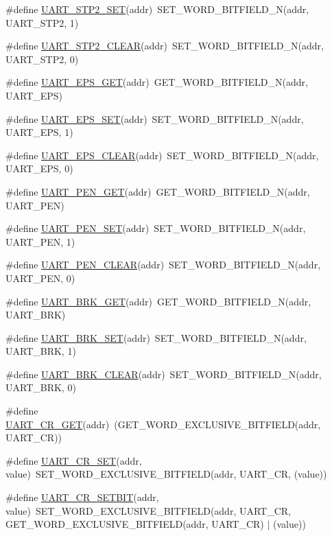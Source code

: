 \begin{DoxyCompactItemize}
\#define \hyperlink{a00574_a9505710cf5fff75d03b84463cccbc3c6}{UART\_\-STP2\_\-SET}(addr)~SET\_\-WORD\_\-BITFIELD\_\-N(addr, UART\_\-STP2, 1)
\item 
\#define \hyperlink{a00574_a9a1979c7d57e8800f1b4c0b36b8ed7ac}{UART\_\-STP2\_\-CLEAR}(addr)~SET\_\-WORD\_\-BITFIELD\_\-N(addr, UART\_\-STP2, 0)
\item 
\#define \hyperlink{a00574_a7d15fcced44d24014b289cf6d86756c2}{UART\_\-EPS\_\-GET}(addr)~GET\_\-WORD\_\-BITFIELD\_\-N(addr, UART\_\-EPS)
\item 
\#define \hyperlink{a00574_a7bd79d501de8f661ee2ac7689781e421}{UART\_\-EPS\_\-SET}(addr)~SET\_\-WORD\_\-BITFIELD\_\-N(addr, UART\_\-EPS, 1)
\item 
\#define \hyperlink{a00574_a4934cd274b04c728ac448f383b773ccb}{UART\_\-EPS\_\-CLEAR}(addr)~SET\_\-WORD\_\-BITFIELD\_\-N(addr, UART\_\-EPS, 0)
\item 
\#define \hyperlink{a00574_a4d70d0b49ce15fb60f2cb085638de0a9}{UART\_\-PEN\_\-GET}(addr)~GET\_\-WORD\_\-BITFIELD\_\-N(addr, UART\_\-PEN)
\item 
\#define \hyperlink{a00574_af7c2b96d9df8e948e1d594035225cadf}{UART\_\-PEN\_\-SET}(addr)~SET\_\-WORD\_\-BITFIELD\_\-N(addr, UART\_\-PEN, 1)
\item 
\#define \hyperlink{a00574_a7a9977a0f0bde9729b9b15a23430b5fc}{UART\_\-PEN\_\-CLEAR}(addr)~SET\_\-WORD\_\-BITFIELD\_\-N(addr, UART\_\-PEN, 0)
\item 
\#define \hyperlink{a00574_af4bc639007e8f0e45c52a22f1e6a0252}{UART\_\-BRK\_\-GET}(addr)~GET\_\-WORD\_\-BITFIELD\_\-N(addr, UART\_\-BRK)
\item 
\#define \hyperlink{a00574_a3f03e69529e75854f7a3aefc628aeb71}{UART\_\-BRK\_\-SET}(addr)~SET\_\-WORD\_\-BITFIELD\_\-N(addr, UART\_\-BRK, 1)
\item 
\#define \hyperlink{a00574_afcd8550d5f745b0cd8e971e0f46f92ed}{UART\_\-BRK\_\-CLEAR}(addr)~SET\_\-WORD\_\-BITFIELD\_\-N(addr, UART\_\-BRK, 0)
\item 
\#define \hyperlink{a00574_abac5e7165d232cd48f2045a0d0bfa3f5}{UART\_\-CR\_\-GET}(addr)~(GET\_\-WORD\_\-EXCLUSIVE\_\-BITFIELD(addr, UART\_\-CR))
\item 
\#define \hyperlink{a00574_a796c27b723205e131ea614caccb1add0}{UART\_\-CR\_\-SET}(addr, value)~SET\_\-WORD\_\-EXCLUSIVE\_\-BITFIELD(addr, UART\_\-CR, (value))
\item 
\#define \hyperlink{a00574_a6722fba270992d6e126c07b70f395cbb}{UART\_\-CR\_\-SETBIT}(addr, value)~SET\_\-WORD\_\-EXCLUSIVE\_\-BITFIELD(addr, UART\_\-CR, GET\_\-WORD\_\-EXCLUSIVE\_\-BITFIELD(addr, UART\_\-CR) $|$ (value))

\end{DoxyCompactItemize}
